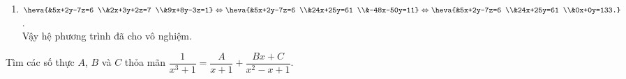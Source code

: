 \begin{bt}
{\begin{enumerate}
			Vậy hệ phương trình có vô số nghiệm dạng $\left( x;y;z \right)=\left( x_0;\dfrac{25-8x_0}{7};\dfrac{6x_0+18}{42} \right)\left( x_0\in \mathbb{R} \right)$.	
			\item $\heva{&5x+2y-7z=6 \\&2x+3y+2z=7 \\&9x+8y-3z=1}\Leftrightarrow \heva{&5x+2y-7z=6 \\&24x+25y=61 \\&-48x-50y=11}\Leftrightarrow \heva{&5x+2y-7z=6 \\&24x+25y=61 \\&0x+0y=133.}$.\\
			Vậy hệ phương trình đã cho vô nghiệm.
		\end{enumerate}
	}
\end{bt}

\begin{bt}%
Tìm các số thực $A$, $B$ và $C$ thỏa mãn $\dfrac{1}{x^3+1}=\dfrac{A}{x+1}+\dfrac{Bx+C}{x^2-x+1}$.
\end{bt}

